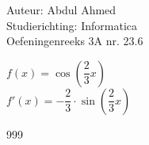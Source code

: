 \documentclass[a4paper]{article}
\begin{document}
  
\noindent \large Auteur: Abdul Ahmed \\
\noindent \large Studierichting: Informatica\\
\noindent \large Oefeningenreeks 3A nr. 23.6\\

\medskip

\normalsize

$f(x)=\cos\left(\dfrac{2}{3}x\right)$ \\

$f'(x) = -\dfrac{2}{3} \cdot \sin \left(\dfrac{2}{3}x\right)$



\begin{thebibliography}{999}
\end{thebibliography}
\end{document}
